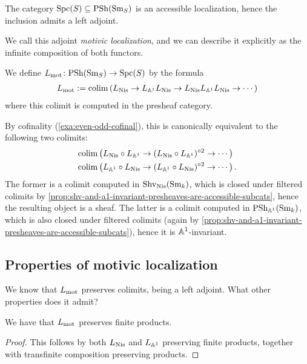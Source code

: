 \documentclass[11pt,openany]{book}
\renewcommand{\Pre}{\mathrm{PSh}}
\begin{document}
\begin{proposition} The category $\mathrm{Spc}(S) \subseteq \mathrm{PSh}(\mathrm{Sm}_S)$ is an accessible localization, hence the inclusion admits a left adjoint.
\end{proposition}
We call this adjoint \textit{motivic localization}, and we can describe it explicitly as the infinite composition of both functors.

\begin{definition} We define $L_\mot \colon \Pre(\Sm_S) \to \Spc(S)$ by the formula
\begin{align*}
    L_{\mathrm{mot}} := \mathrm{colim} \left( L_{\mathrm{Nis}} \to L_{\mathbb{A}^1} L_{\mathrm{Nis}} \to L_{\mathrm{Nis}} L_{\mathbb{A}^1}L_{\mathrm{Nis}} \to \cdots \right)
\end{align*}
where this colimit is computed in the presheaf category.
\end{definition}

\begin{remark}\label{rmk:Lmot-cofinality} 
By cofinality (\autoref{exa:even-odd-cofinal}), this is canonically equivalent to the following two colimits:
\begin{align*}
    &\mathrm{colim} \left( L_{\mathrm{Nis}} \circ L_{\mathbb{A}^1} \to (L_{\mathrm{Nis}} \circ L_{\mathbb{A}^1})^{\circ 2} \to \cdots  \right) \\
    &\mathrm{colim} \left( L_{\mathbb{A}^1}\circ L_{\mathrm{Nis}} \to ( L_{\mathbb{A}^1} \circ L_{\mathrm{Nis}})^{\circ 2} \to \cdots  \right).
\end{align*}
The former is a colimit computed in $\mathrm{Shv}_{\mathrm{Nis}}(\mathrm{Sm}_k)$, which is closed under filtered colimits by \autoref{prop:shv-and-a1-invariant-presheaves-are-accessible-subcats}, hence the resulting object is a sheaf. The latter is a colimit computed in $\Pre_{\A^1}(\Sm_k)$, which is also closed under filtered colimits (again by \autoref{prop:shv-and-a1-invariant-presheaves-are-accessible-subcats}), hence it is $\mathbb{A}^1$-invariant.
\end{remark}


\subsection{Properties of motivic localization}

We know that $L_{\mathrm{mot}}$ preserves colimits, being a left adjoint. What other properties does it admit?

\begin{proposition} \cite[C.6]{Hoyois} We have that $L_{\mathrm{mot}}$ preserves finite products.
\end{proposition}
\begin{proof} This follows by both $L_{\mathrm{Nis}}$ and $L_{\mathbb{A}^1}$ preserving finite products, together with transfinite composition preserving products.
\end{proof}
\end{document}
